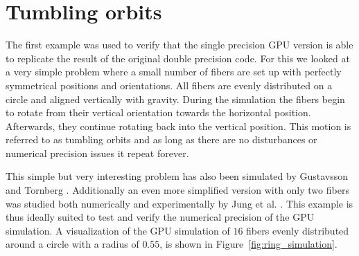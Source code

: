 \documentclass[a4paper,11pt]{kth-mag}
\begin{document}
\section{Tumbling orbits}
\label{sec:example_ring}

The first example was used to verify that the single precision GPU version is able to replicate the result of the original double precision code. For this we looked at a very simple problem where a small number of fibers are set up with perfectly symmetrical positions and orientations. All fibers are evenly distributed on a circle and aligned vertically with gravity. During the simulation the fibers begin to rotate from their vertical orientation towards the horizontal position. Afterwards, they continue rotating back into the vertical position. This motion is referred to as tumbling orbits and as long as there are no disturbances or numerical precision issues it repeat forever.

This simple but very interesting problem has also been simulated by Gustavsson and Tornberg \cite{Gustavsson2009}. Additionally an even more simplified version with only two fibers was studied both numerically and experimentally by Jung et al. \cite{Jung2006}. This example is thus ideally suited to test and verify the numerical precision of the GPU simulation. A visualization of the GPU simulation of $16$ fibers evenly distributed around a circle with a radius of $0.55$, is shown in Figure~\ref{fig:ring_simulation}.
\end{document}
